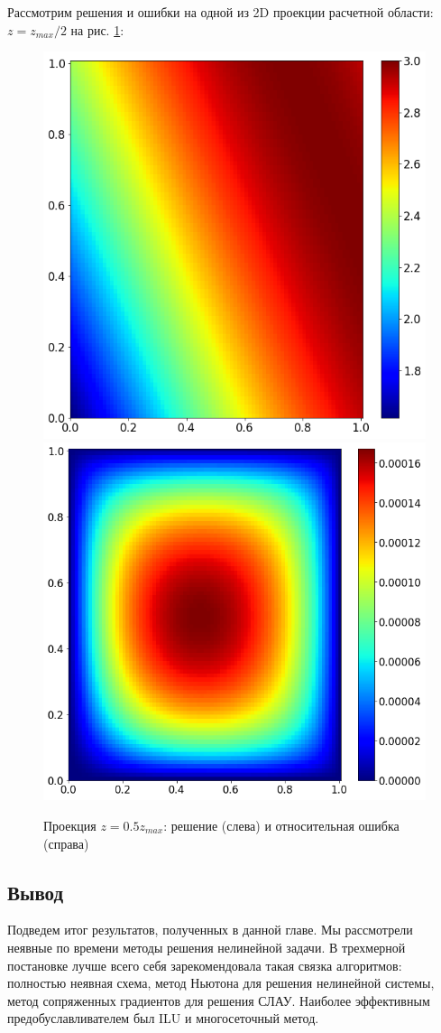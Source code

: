 Рассмотрим решения и ошибки на одной из 2D проекции расчетной области: $z = z_{max} / 2$ на рис. \ref{fig:heat3d_field}:

\begin{figure}[H]
\centering
\includegraphics[height=.45\textwidth]{heat3d/solution_80dots.png}
\includegraphics[height=.45\textwidth]{heat3d/rel_err_80dots.png}
\caption{Проекция $z=0.5z_{max}$: решение (слева) и относительная ошибка (справа)}
\label{fig:heat3d_field}
\end{figure}

\subsection{Вывод}
Подведем итог результатов, полученных в данной главе. Мы рассмотрели неявные по времени методы решения нелинейной задачи. В трехмерной постановке лучше всего себя зарекомендовала такая связка алгоритмов: полностью неявная схема, метод Ньютона для решения нелинейной системы, метод сопряженных градиентов для решения СЛАУ. Наиболее эффективным предобуславливателем был ILU и многосеточный метод. 
